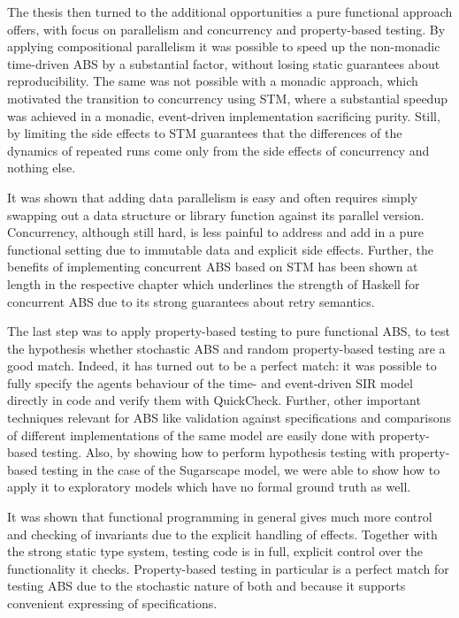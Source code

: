 \medskip

The thesis then turned to the additional opportunities a pure functional approach offers, with focus on parallelism and concurrency and property-based testing. By applying compositional parallelism it was possible to speed up the non-monadic time-driven ABS by a substantial factor, without losing static guarantees about reproducibility. The same was not possible with a monadic approach, which motivated the transition to concurrency using STM, where a substantial speedup was achieved in a monadic, event-driven implementation sacrificing purity. Still, by limiting the side effects to STM guarantees that the differences of the dynamics of repeated runs come only from the side effects of concurrency and nothing else. 

It was shown that adding data parallelism is easy and often requires simply swapping out a data structure or library function against its parallel version. Concurrency, although still hard, is less painful to address and add in a pure functional setting due to immutable data and explicit side effects. Further, the benefits of implementing concurrent ABS based on STM has been shown at length in the respective chapter which underlines the strength of Haskell for concurrent ABS due to its strong guarantees about retry semantics.

\medskip

The last step was to apply property-based testing to pure functional ABS, to test the hypothesis whether stochastic ABS and random property-based testing are a good match. Indeed, it has turned out to be a perfect match: it was possible to fully specify the agents behaviour of the time- and event-driven SIR model directly in code and verify them with QuickCheck. Further, other important techniques relevant for ABS like validation against specifications and comparisons of different implementations of the same model are easily done with property-based testing. Also, by showing how to perform hypothesis testing with property-based testing in the case of the Sugarscape model, we were able to show how to apply it to exploratory models which have no formal ground truth as well.

It was shown that functional programming in general gives much more control and checking of invariants due to the explicit handling of effects. Together with the strong static type system, testing code is in full, explicit control over the functionality it checks. Property-based testing in particular is a perfect match for testing ABS due to the stochastic nature of both and because it supports convenient expressing of specifications. %

